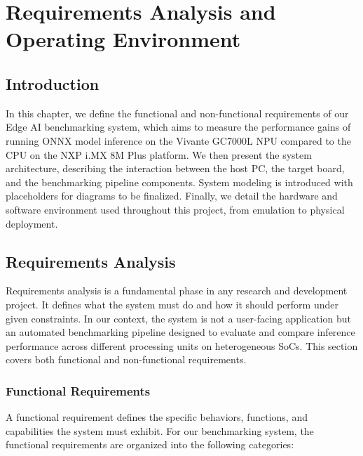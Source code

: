 \chapter{Requirements Analysis and Operating Environment}

\section*{Introduction}
In this chapter, we define the functional and non-functional requirements of our Edge AI benchmarking system, which aims to measure the performance gains of running ONNX model inference on the Vivante GC7000L NPU compared to the CPU on the NXP i.MX 8M Plus platform. We then present the system architecture, describing the interaction between the host PC, the target board, and the benchmarking pipeline components. System modeling is introduced with placeholders for diagrams to be finalized. Finally, we detail the hardware and software environment used throughout this project, from emulation to physical deployment.

\section{Requirements Analysis}
Requirements analysis is a fundamental phase in any research and development project. It defines what the system must do and how it should perform under given constraints. In our context, the system is not a user-facing application but an automated benchmarking pipeline designed to evaluate and compare inference performance across different processing units on heterogeneous SoCs. This section covers both functional and non-functional requirements.

\subsection{Functional Requirements}
A functional requirement defines the specific behaviors, functions, and capabilities the system must exhibit. For our benchmarking system, the functional requirements are organized into the following categories:

